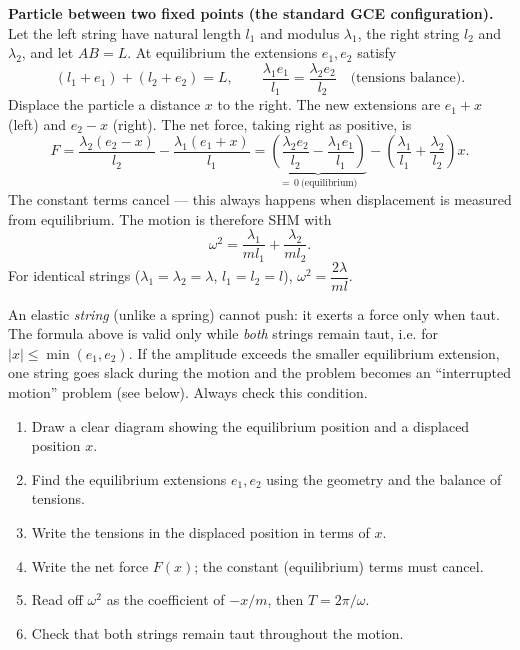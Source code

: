 \documentclass[11pt]{article}
\begin{document}
\textbf{Particle between two fixed points (the standard GCE configuration).}
Let the left string have natural length $l_1$ and modulus $\lambda_1$, the right string $l_2$ and $\lambda_2$, and let $AB = L$. At equilibrium the extensions $e_1, e_2$ satisfy
\[
(l_1 + e_1) + (l_2 + e_2) = L, \qquad \frac{\lambda_1 e_1}{l_1} = \frac{\lambda_2 e_2}{l_2} \quad \text{(tensions balance).}
\]
Displace the particle a distance $x$ to the right. The new extensions are $e_1 + x$ (left) and $e_2 - x$ (right). The net force, taking right as positive, is
\[
F = \frac{\lambda_2 (e_2 - x)}{l_2} - \frac{\lambda_1 (e_1 + x)}{l_1}
= \underbrace{\left(\frac{\lambda_2 e_2}{l_2} - \frac{\lambda_1 e_1}{l_1}\right)}_{=\,0\ \text{(equilibrium)}} - \left( \frac{\lambda_1}{l_1} + \frac{\lambda_2}{l_2} \right) x.
\]
The constant terms cancel — this always happens when displacement is measured from equilibrium. The motion is therefore SHM with
\[
\omega^2 = \frac{\lambda_1}{m l_1} + \frac{\lambda_2}{m l_2}.
\]
For identical strings ($\lambda_1 = \lambda_2 = \lambda$, $l_1 = l_2 = l$), $\omega^2 = \dfrac{2\lambda}{ml}$.

\begin{attention}
An elastic \emph{string} (unlike a spring) cannot push: it exerts a force only when taut. The formula above is valid only while \emph{both} strings remain taut, i.e. for $|x| \le \min(e_1, e_2)$. If the amplitude exceeds the smaller equilibrium extension, one string goes slack during the motion and the problem becomes an ``interrupted motion'' problem (see below). Always check this condition.
\end{attention}

\begin{methode}
\begin{enumerate}
\item Draw a clear diagram showing the equilibrium position and a displaced position $x$.
\item Find the equilibrium extensions $e_1, e_2$ using the geometry and the balance of tensions.
\item Write the tensions in the displaced position in terms of $x$.
\item Write the net force $F(x)$; the constant (equilibrium) terms must cancel.
\item Read off $\omega^2$ as the coefficient of $-x/m$, then $T = 2\pi/\omega$.
\item Check that both strings remain taut throughout the motion.
\end{enumerate}
\end{methode}
\end{document}
